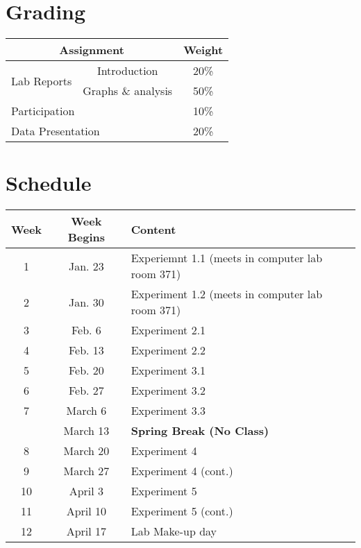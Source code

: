 \section*{Grading}

\begin{tabular}{ |l|c|c| } 
 \hline
 \multicolumn{2}{|c|}{\textbf{Assignment}} & \textbf{Weight} \\ 
 \hline
 \multirow{2}{*}{Lab Reports} & Introduction & 20\% \\
 \cline{2-3}
                              & Graphs \& analysis & 50\% \\ 
 \hline 
 \multicolumn{2}{|l|}{Participation} & 10\% \\ 
 \hline
 \multicolumn{2}{|l|}{Data Presentation} & 20\% \\ 
 \hline
\end{tabular}

\newpage 

\section*{Schedule}

\begin{tabular}{ |c|c|l| } 
 \hline
 \textbf{Week} & \textbf{Week Begins} & \textbf{Content} \\ 
 \hline
 1 & Jan. 23 & Experiemnt 1.1 (meets in computer lab room 371) \\ 
 \hline
 2 & Jan. 30 & Experiment 1.2 (meets in computer lab room 371)\\ 
 \hline
 3 & Feb. 6 & Experiment 2.1 \\ 
 \hline
 4 & Feb. 13 & Experiment 2.2 \\ 
 \hline
 5 & Feb. 20 & Experiment 3.1 \\ 
 \hline
 6 & Feb. 27 & Experiment 3.2 \\ 
 \hline
 7 & March 6 & Experiment 3.3 \\ 
 \hline
   & March 13 & \textbf{Spring Break (No Class)} \\ 
 \hline
 8 & March 20 & Experiment 4 \\ 
 \hline
 9 & March 27 & Experiment 4 (cont.) \\ 
 \hline
 10 & April 3 & Experiment 5 \\ 
 \hline
 11 & April 10 & Experiment 5 (cont.) \\ 
 \hline
 12 & April 17 & Lab Make-up day \\ 
 \hline
\end{tabular}


